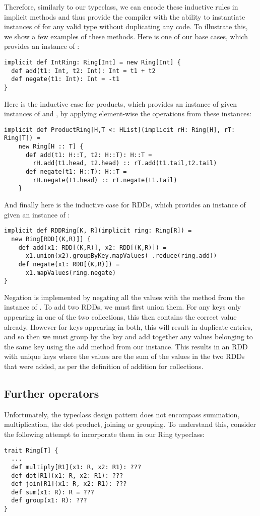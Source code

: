 Therefore, similarly to our  typeclass, we can encode these inductive rules in implicit methods and thus provide the compiler with the ability to instantiate instances of  for any valid type  without duplicating any code. To illustrate this, we show a few examples of these methods. Here is one of our base cases, which provides an instance of :
\vs\begin{lstlisting}
implicit def IntRing: Ring[Int] = new Ring[Int] {
  def add(t1: Int, t2: Int): Int = t1 + t2
  def negate(t1: Int): Int = -t1
}
\end{lstlisting}\vs
Here is the inductive case for products, which provides an instance of  given instances of  and , by applying element-wise the operations from these instances:
\vs\begin{lstlisting}
implicit def ProductRing[H,T <: HList](implicit rH: Ring[H], rT: Ring[T]) =
    new Ring[H :: T] {
      def add(t1: H::T, t2: H::T): H::T =
        rH.add(t1.head, t2.head) :: rT.add(t1.tail,t2.tail)
      def negate(t1: H::T): H::T =
        rH.negate(t1.head) :: rT.negate(t1.tail)
    }
\end{lstlisting}\vs
And finally here is the inductive case for RDDs, which provides an instance of  given an instance of :
\vs\begin{lstlisting}
implicit def RDDRing[K, R](implicit ring: Ring[R]) =
  new Ring[RDD[(K,R)]] {
    def add(x1: RDD[(K,R)], x2: RDD[(K,R)]) =
      x1.union(x2).groupByKey.mapValues(_.reduce(ring.add))
    def negate(x1: RDD[(K,R)]) =
      x1.mapValues(ring.negate)
}
\end{lstlisting}\vs
Negation is implemented by negating all the values with the method from the instance of . To add two RDDs, we must first union them. For any keys only appearing in one of the two collections, this then contains the correct value already. However for keys appearing in both, this will result in duplicate entries, and so then we must group by the key and add together any values belonging to the same key using the add method from our  instance. This results in an RDD with unique keys where the values are the sum of the values in the two RDDs that were added, as per the definition of addition for collections.

\subsection{Further operators}
Unfortunately, the typeclass design pattern does not encompass summation, multiplication, the dot product, joining or grouping. To understand this, consider the following attempt to incorporate them in our Ring typeclass:
\vs\begin{lstlisting}
trait Ring[T] {
  ...
  def multiply[R1](x1: R, x2: R1): ???
  def dot[R1](x1: R, x2: R1): ???
  def join[R1](x1: R, x2: R1): ???
  def sum(x1: R): R = ???
  def group(x1: R): ???
}
\end{lstlisting}\vs

